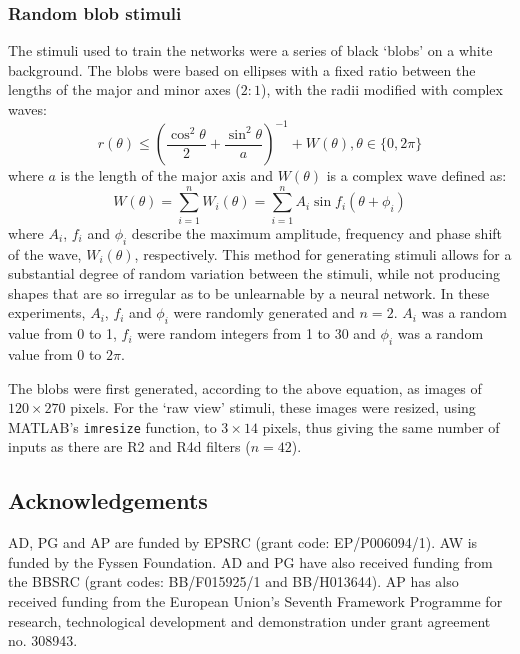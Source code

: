 \subsubsection*{Random blob stimuli}
\label{sec:methods:stimuli}
The stimuli used to train the networks were a series of black `blobs' on a white background.
The blobs were based on ellipses with a fixed ratio between the lengths of the major and minor axes ($2:1$), with the radii modified with complex waves:
$$
r(\theta) \le \left(\frac{\cos^2 \theta}{2} + \frac{\sin^2 \theta}{a} \right)^{-1} + W(\theta), \theta \in \{0, 2\pi\}
$$
where $a$ is the length of the major axis and $W(\theta)$ is a complex wave defined as:
$$
W(\theta) = \sum_{i=1}^n W_i(\theta) = \sum_{i=1}^n A_i \sin f_i (\theta+\phi_i) 
$$
where $A_i$, $f_i$ and $\phi_i$ describe the maximum amplitude, frequency and phase shift of the wave, $W_i(\theta)$, respectively.
This method for generating stimuli allows for a substantial degree of random variation between the stimuli, while not producing shapes that are so irregular as to be unlearnable by a neural network.
In these experiments, $A_i$, $f_i$ and $\phi_i$ were randomly generated and $n=2$.
$A_i$ was a random value from 0 to 1, $f_i$ were random integers from 1 to 30 and $\phi_i$ was a random value from 0 to $2\pi$.
\begin{comment}
nvar = 1000;
nwave = 2;
maxfreq = 30;
maxamp = 1;
\end{comment}

The blobs were first generated, according to the above equation, as images of $120\times 270$ pixels.
For the `raw view' stimuli, these images were resized, using MATLAB's \texttt{imresize} function, to $3\times 14$ pixels, thus giving the same number of inputs as there are R2 and R4d filters ($n=42$).

\subsection*{Acknowledgements}
AD, PG and AP are funded by EPSRC (grant code: EP/P006094/1).
AW is funded by the Fyssen Foundation.
AD and PG have also received funding from the BBSRC (grant codes: BB/F015925/1 and BB/H013644).
AP has also received funding from the European Union’s Seventh Framework Programme for research, technological development and demonstration under grant agreement no. 308943.

